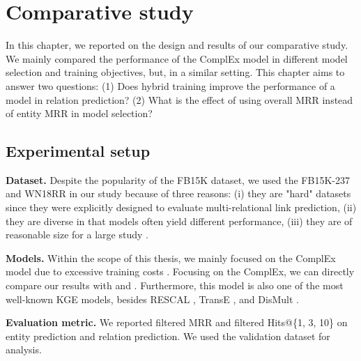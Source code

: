 
\chapter{Comparative study}
\label{chap:comparative_study}

In this chapter, we reported on the design and results of our comparative study. We mainly compared the performance of the ComplEx model in different model selection and training objectives, but, in a similar setting. This chapter aims to answer two questions: (1) Does hybrid training improve the performance of a model in relation prediction? (2) What is the effect of using overall MRR instead of entity MRR in model selection?

\section{Experimental setup}

\noindent\textbf{Dataset.} Despite the popularity of the FB15K dataset, we used the FB15K-237 and WN18RR in our study because of three reasons: (i) they are "hard" datasets since they were explicitly designed to evaluate multi-relational link prediction, (ii) they are diverse in that models often yield different performance, (iii) they are of reasonable size for a large study \citep{Ruffinelli2020You}.
\newline


\noindent\textbf{Models.} Within the scope of this thesis, we mainly focused on the ComplEx model due to excessive training costs \citep{trouillon2016complex}. Focusing on the ComplEx, we can directly compare our results with \citet{chen2021relation} and \citet{Ruffinelli2020You}. Furthermore, this model is also one of the most well-known KGE models, besides RESCAL \citep{nickel2011three}, TransE \citep{bordes2013translating}, and DisMult \citep{yang2014embedding}. 
\newline

\noindent\textbf{Evaluation metric.} We reported filtered MRR and filtered Hits@\{1, 3, 10\} on entity prediction and relation prediction. We used the validation dataset for analysis.
\newline

